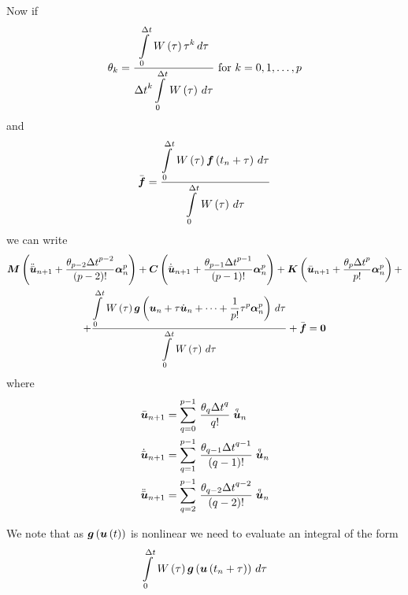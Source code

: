 Now if 
\begin{equation}
  \theta_{k}=\dfrac{  \displaystyle\int\limits_{0}^{\Delta t} \, W\left( \tau \right) \tau^{k}\,d\tau }{{\Delta
      t}^{k}  \displaystyle\int\limits_{0}^{\Delta t} \, W\left( \tau \right) \,d\tau } \text{  for  } k=0,1,\ldots,p
\end{equation}
and
\begin{equation}
  \bar{\vectr{f}}=\dfrac{\gint{0}{\Delta
      t}{\fnof{W}{\tau}\fnof{\vectr{f}}{t_{n}+\tau}}{\tau}}{
    \gint{0}{\Delta t}{\fnof{W}{\tau}}{\tau}}
  \label{eqn:meanweightedloadvector}
\end{equation}
we can write
\begin{multline}
  \matr{M}\pbrac{\ddot{\bar{\vectr{u}}}_{n+1}+\dfrac{\theta_{p-2}{\Delta
        t}^{p-2}}{\factorial{p-2}}\vectr{\alpha}^{p}_{n}}+
  \matr{C}\pbrac{\dot{\bar{\vectr{u}}}_{n+1}+\dfrac{\theta_{p-1}{\Delta
        t}^{p-1}}{\factorial{p-1}}\vectr{\alpha}^{p}_{n}}+
  \matr{K}\pbrac{\bar{\vectr{u}}_{n+1}+\dfrac{\theta_{p}{\Delta
        t}^{p}}{p!}\vectr{\alpha}^{p}_{n}}+ \\
  + \dfrac{\gint{0}{\Delta t}{\fnof{W}{\tau}\fnof{\vectr{g}}{\vectr{u}_{n}+\tau\dot{\vectr{u}}_{n}+\cdots+
        \dfrac{1}{p!}\tau^{p}\vectr{\alpha}^{p}_{n}}}{\tau}}{\gint{0}{\Delta
      t}{\fnof{W}{\tau}}{\tau}}+\bar{\vectr{f}}=\vectr{0}
  \label{eqn:dynamic1}
\end{multline}
where
\begin{equation}
  \begin{split}
    \bar{\boldsymbol{u}}_{n+1} &=   \displaystyle\sum_{q=0}^{p-1} \,\dfrac{\theta_{q}{\Delta
            t}^{q}}{q!} \stackrel{\scriptscriptstyle q}{\boldsymbol{u}} _{n}  \\
    \dot{\bar{\boldsymbol{u}}}_{n+1} &=   \displaystyle\sum_{q=1}^{p-1} \,\dfrac{\theta_{q-1}{\Delta
            t}^{q-1}}{\left( q-1 \right)!} \stackrel{\scriptscriptstyle q}{\boldsymbol{u}} _{n}  \\
    \ddot{\bar{\boldsymbol{u}}}_{n+1} &=   \displaystyle\sum_{q=2}^{p-1} \,\dfrac{\theta_{q-2}{\Delta
            t}^{q-2}}{\left( q-2 \right)!} \stackrel{\scriptscriptstyle q}{\boldsymbol{u}} _{n}  
  \end{split}
\end{equation}

We note that as $ \boldsymbol{g}\left(  \boldsymbol{u}\left( t \right)  \right) $ is nonlinear we need to
evaluate an integral of the form
\begin{equation}
    \displaystyle\int\limits_{0}^{\Delta t} \, W\left( \tau \right)  \boldsymbol{g}\left(  \boldsymbol{u}\left( t_{n}+\tau \right)  \right) \,d\tau 
\end{equation}

